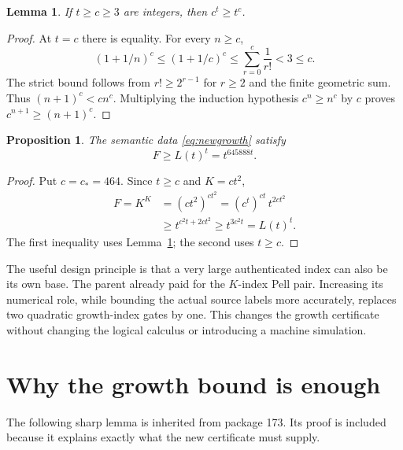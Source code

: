 \documentclass[11pt,a4paper]{article}
\newtheorem{lemma}[theorem]{Lemma}
\newtheorem{proposition}[theorem]{Proposition}
\theoremstyle{definition}
\begin{document}
\begin{lemma}\label{lem:power}
If $t\ge c\ge3$ are integers, then $c^t\ge t^c$.
\end{lemma}
\begin{proof}
At $t=c$ there is equality. For every $n\ge c$,
\[
 (1+1/n)^c\le(1+1/c)^c
 \le\sum_{r=0}^{c}\frac1{r!}<3\le c.
\]
The strict bound follows from $r!\ge2^{r-1}$ for $r\ge2$ and the finite
geometric sum. Thus $(n+1)^c<cn^c$. Multiplying the induction hypothesis
$c^n\ge n^c$ by $c$ proves $c^{n+1}\ge(n+1)^c$.
\end{proof}

\begin{proposition}\label{prop:growth}
The semantic data \eqref{eq:newgrowth} satisfy
\begin{equation}\label{eq:growthbound}
 F\ge L(t)^t=t^{645888t}.
\end{equation}
\end{proposition}
\begin{proof}
Put $c=c_*=464$. Since $t\ge c$ and $K=ct^2$,
\begin{align*}
 F=K^K
  &=(ct^2)^{ct^2}
    =(c^t)^{ct}\,t^{2ct^2}\\
  &\ge t^{c^2t+2ct^2}
   \ge t^{3c^2t}=L(t)^t.
\end{align*}
The first inequality uses Lemma~\ref{lem:power}; the second uses $t\ge c$.
\end{proof}

The useful design principle is that a very large authenticated index can
also be its own base. The parent already paid for the $K$-index Pell pair.
Increasing its numerical role, while bounding the actual source labels
more accurately, replaces two quadratic growth-index gates by one.
This changes the growth certificate without changing the logical
calculus or introducing a machine simulation.

\section{Why the growth bound is enough}\label{sec:separation}

The following sharp lemma is inherited from package 173. Its proof is
included because it explains exactly what the new certificate must supply.
\end{document}
